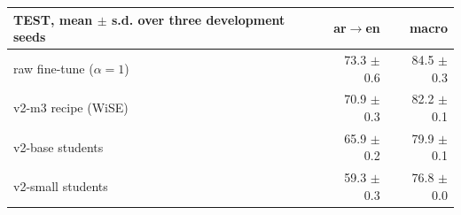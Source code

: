 \begin{tabular}{@{}lrr@{}}
\toprule
TEST, mean $\pm$ s.d. over three development seeds & ar$\to$en & macro \\
\midrule
raw fine-tune ($\alpha{=}1$) & 73.3 $\pm$ 0.6 & 84.5 $\pm$ 0.3 \\
v2-m3 recipe (WiSE) & 70.9 $\pm$ 0.3 & 82.2 $\pm$ 0.1 \\
v2-base students & 65.9 $\pm$ 0.2 & 79.9 $\pm$ 0.1 \\
v2-small students & 59.3 $\pm$ 0.3 & 76.8 $\pm$ 0.0 \\
\bottomrule
\end{tabular}
